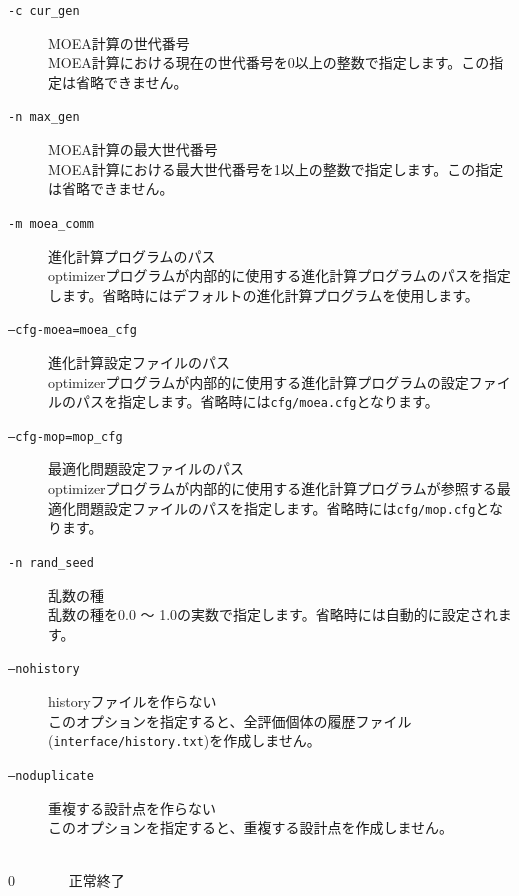 \documentclass[a4paper,11pt]{jarticle}
\begin{document}
{\begin{description}
\begin{description}
\item[{\tt -c cur\_gen}] MOEA計算の世代番号\\
MOEA計算における現在の世代番号を0以上の整数で指定します。この指定は省略できません。\\

\item[{\tt -n max\_gen}] MOEA計算の最大世代番号\\
MOEA計算における最大世代番号を1以上の整数で指定します。この指定は省略できません。\\

\item[{\tt -m moea\_comm}] 進化計算プログラムのパス\\
optimizerプログラムが内部的に使用する進化計算プログラムのパスを指定します。省略時にはデフォルトの進化計算プログラムを使用します。

\item[{\tt --cfg-moea=moea\_cfg}] 進化計算設定ファイルのパス\\
optimizerプログラムが内部的に使用する進化計算プログラムの設定ファイルのパスを指定します。省略時には{\tt cfg/moea.cfg}となります。\\

\item[{\tt --cfg-mop=mop\_cfg}] 最適化問題設定ファイルのパス\\
optimizerプログラムが内部的に使用する進化計算プログラムが参照する最適化問題設定ファイルのパスを指定します。省略時には{\tt cfg/mop.cfg}となります。\\

\item[{\tt -n rand\_seed}] 乱数の種\\
乱数の種を0.0 〜 1.0の実数で指定します。省略時には自動的に設定されます。\\

\item[{\tt --nohistory}] historyファイルを作らない\\
このオプションを指定すると、全評価個体の履歴ファイル({\tt interface/history.txt})を作成しません。\\

\item[{\tt --noduplicate}] 重複する設計点を作らない\\
このオプションを指定すると、重複する設計点を作成しません。\\

\end{description}

\item[戻り値(終了ステータス)] {\ }\\
0 \ \ \ \ \ \ \ 正常終了


\end{description}}
\end{document}
